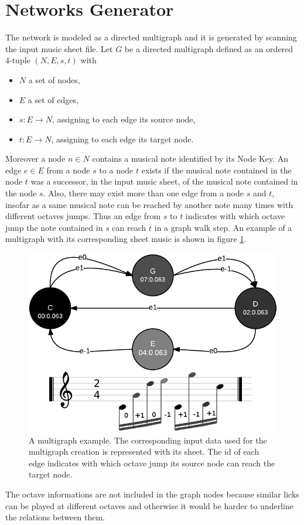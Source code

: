 \documentclass{llncs}
\begin{document}
\section{Networks Generator}
\label{sec:networks}
The network is modeled as a directed multigraph\cite{graph-theory} and it is generated
by scanning the input music sheet file. Let $G$ be a directed
multigraph defined as an ordered 4-tuple $(N,E,s,t)$ with
\begin{itemize}
	\item $N$ a set of nodes,
	\item $E$ a set of edges,
	\item $s: E \rightarrow  N$, assigning to each edge its source node,
	\item $t: E \rightarrow N$, assigning to each edge its target node.
\end{itemize}
Moreover a node $n \in N$ contains a musical note identified by its Node Key.
An edge $e \in E$ from a node $s$ to a node $t$ exists if the musical note
contained in the node $t$ was a successor, in the input music sheet, of the musical note 
contained in the node $s$. Also, there may exist more than one edge from
a node $s$ and $t$,
insofar as a same musical note can be reached by another note many times with
different octaves jumps. Thus an edge from $s$ to $t$ indicates with which
octave jump the note contained in $s$ can reach $t$ in a graph walk step.
An example of a multigraph with its corresponding sheet music is shown
in figure \ref{fig:multigraph}.
\begin{figure}
\centering
\includegraphics[scale=0.4]{multigraph.png}
\caption{A multigraph example. The corresponding input data used for the multigraph
creation is represented with its sheet. The id of each edge
indicates with which octave jump its source node can reach the target
node.}
\label{fig:multigraph}
\end{figure}
The octave informations are not included in the graph nodes because 
similar licks can be played at different octaves and otherwise it would be
harder to underline the relations between them.
\end{document}
